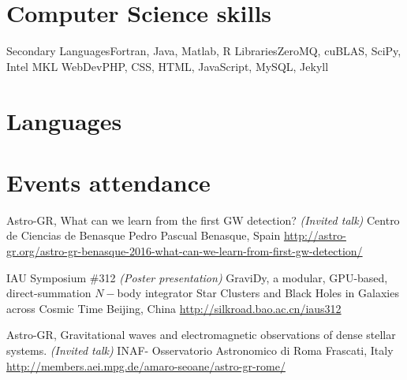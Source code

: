 \documentclass[12pt,a4paper]{moderncv}
\begin{document}
\section{\LARGE Computer Science skills}
           {\textcolor{color1}{Secondary Languages}}{Fortran, Java, Matlab, R}
           {\textcolor{color1}{Libraries}}{ZeroMQ, cuBLAS, SciPy, Intel MKL}
           {\textcolor{color1}{WebDev}}{PHP, CSS, HTML, JavaScript, MySQL, Jekyll}
           {}{}

\newpage
\section{\LARGE Languages}


\section{\LARGE Events attendance}
        {Astro-GR, What can we learn from the first GW detection? \emph{(Invited talk)}}
        {Centro de Ciencias de Benasque Pedro Pascual}
        {Benasque, Spain}
        {\url{http://astro-gr.org/astro-gr-benasque-2016-what-can-we-learn-from-first-gw-detection/}}
        {}

        {IAU Symposium \#312 \emph{(Poster presentation)}}
        {GraviDy, a modular, GPU-based, direct-summation $N-$body integrator}
        {Star Clusters and Black Holes in Galaxies across Cosmic Time}
        {Beijing, China}
        {\url{http://silkroad.bao.ac.cn/iaus312}}

        {Astro-GR, Gravitational waves and electromagnetic observations of dense
        stellar systems. \emph{(Invited talk)}}
        {INAF- Osservatorio Astronomico di Roma}
        {Frascati, Italy}
        {\url{http://members.aei.mpg.de/amaro-seoane/astro-gr-rome/}}
        {}
\end{document}

